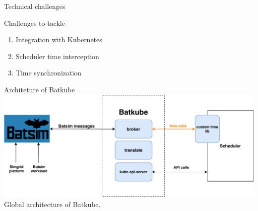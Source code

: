 \documentclass[12pt, aspectratio=43]{beamer}
\begin{document}
\begin{frame}{Technical challenges}
	\begin{alertblock}{Challenges to tackle}
		\begin{enumerate}
			\item Integration with Kubernetes
			\item Scheduler time interception
			\item Time synchronization
		\end{enumerate}
	\end{alertblock}
\end{frame}

\begin{frame}{Architeture of Batkube}
	\centering
	\includegraphics[width=\textwidth]{../imgs/batkube-architecture-3-synchro.pdf}
	\small{Global architecture of Batkube.}
\end{frame}
\end{document}
